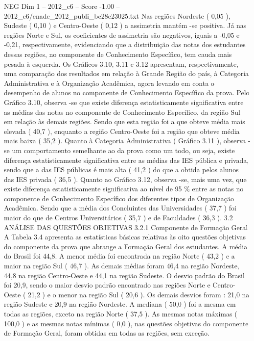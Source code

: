 \begin{textsample}{NEG Dim 1 – 2012\_c6 – Score -1.00 – 2012\_c6/enade\_2012\_publi\_bc28e23025.txt}
Nas regiões Nordeste ( 0,05 ), Sudeste ( 0,10 ) e Centro-Oeste ( 0,12 ) a assimetria mantém -se positiva.
Já nas regiões Norte e Sul, os coeficientes de assimetria são negativos, iguais a -0,05 e -0,21, respectivamente, evidenciando que a distribuição das notas dos estudantes dessas regiões, no componente de Conhecimento Específico, tem cauda mais pesada à esquerda.
Os Gráficos 3.10, 3.11 e 3.12 apresentam, respectivamente, uma comparação dos resultados em relação à Grande Região do país, à Categoria Administrativa e à Organização Acadêmica, agora levando em conta o desempenho de alunos no componente de Conhecimento Específico da prova.
Pelo Gráfico 3.10, observa -se que existe diferença estatisticamente significativa entre as médias das notas no componente de Conhecimento Específico, da região Sul em relação às demais regiões.
Sendo que esta região foi a que obteve média mais elevada ( 40,7 ), enquanto a região Centro-Oeste foi a região que obteve média mais baixa ( 35,2 ).
Quanto à Categoria Administrativa ( Gráfico 3.11 ), observa -se um comportamento semelhante ao da prova como um todo, ou seja, existe diferença estatisticamente significativa entre as médias das IES pública e privada, sendo que a das IES públicas é mais alta ( 41,2 ) do que a obtida pelos alunos das IES privada ( 36,5 ).
Quanto ao Gráfico 3.12, observa -se, mais uma vez, que existe diferença estatisticamente significativa ao nível de 95 \% entre as notas no componente de Conhecimento Específico dos diferentes tipos de Organização Acadêmica.
Sendo que a média dos Concluintes das Universidades ( 37,7 ) foi maior do que de Centros Universitários ( 35,7 ) e de Faculdades ( 36,3 ). 3.2 ANÁLISE DAS QUESTÕES OBJETIVAS 3.2.1 Componente de Formação Geral A Tabela 3.4 apresenta as estatísticas básicas relativas às oito questões objetivas do componente da prova que abrange a Formação Geral dos estudantes.
A média do Brasil foi 44,8.
A menor média foi encontrada na região Norte ( 43,2 ) e a maior na região Sul ( 46,7 ).
As demais médias foram 46,4 na região Nordeste, 44,8 na região Centro-Oeste e 44,1 na região Sudeste.
O desvio padrão do Brasil foi 20,9, sendo o maior desvio padrão encontrado nas regiões Norte e Centro-Oeste ( 21,2 ) e o menor na região Sul ( 20,6 ).
Os demais desvios foram : 21,0 na região Sudeste e 20,9 na região Nordeste.
A mediana ( 50,0 ) foi a mesma em todas as regiões, exceto na região Norte ( 37,5 ).
As mesmas notas máximas ( 100,0 ) e as mesmas notas mínimas ( 0,0 ), nas questões objetivas do componente de Formação Geral, foram obtidas em todas as regiões, sem exceção.

\end{textsample}
